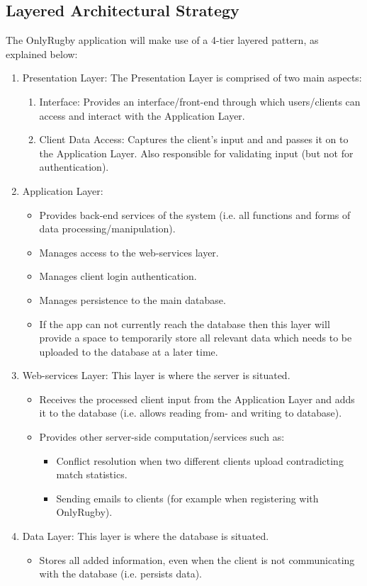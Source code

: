 \documentclass[hidelinks,a4paper,12pt]{article}
\begin{document}
	\subsection{Layered Architectural Strategy}
	The OnlyRugby application will make use of a 4-tier layered pattern, as explained below:
	\begin{enumerate}
		\item Presentation Layer:
		The Presentation Layer is comprised of two main aspects:
		\begin{enumerate}
			\item Interface: Provides an interface/front-end through which users/clients can access and interact with the Application Layer.
			\item Client Data Access: Captures the client's input and and passes it on to the Application Layer. Also responsible for validating input (but not for authentication).
		\end {enumerate}
		\item Application Layer:
		\begin{itemize}
			\item Provides back-end services of the system (i.e. all functions and forms of data processing/manipulation).
			\item Manages access to the web-services layer.
			\item Manages client login authentication.
			\item Manages persistence to the main database.
			\item If the app can not currently reach the database then this layer will provide a space to temporarily store all relevant data which needs to be uploaded to the database at a later time.
		\end {itemize}
		\item Web-services Layer:
		This layer is where the server is situated.
		\begin{itemize}
			\item Receives the processed client input from the Application Layer and adds it to the database (i.e. allows reading from- and writing to database).
			\item Provides other server-side computation/services such as:
				\begin{itemize}
					\item Conflict resolution when two different clients upload contradicting match statistics.
					\item Sending emails to clients (for example when registering with OnlyRugby).
				\end{itemize}
		\end{itemize}
		\item Data Layer:
		This layer is where the database is situated.
		\begin{itemize}
			\item Stores all added information, even when the client is not communicating with the database (i.e. persists data).
		\end{itemize}


\end{enumerate}
\end{document}
